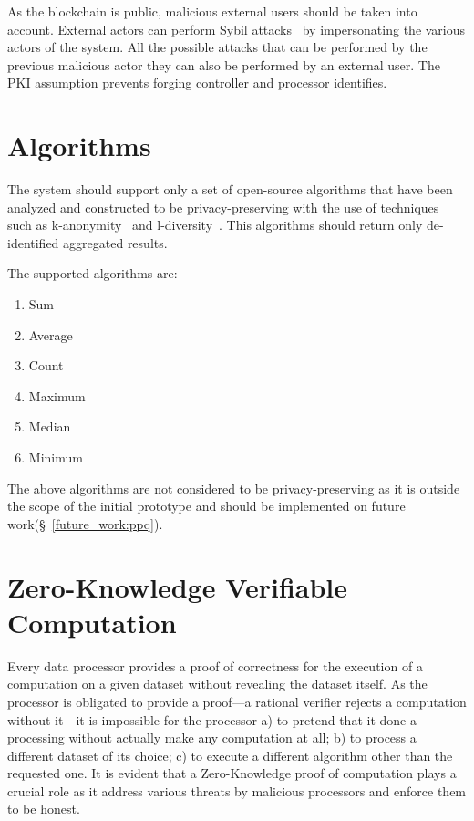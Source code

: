As the blockchain is public, malicious external users should be taken into account. External actors can perform Sybil attacks~\cite{sybil_attack} by impersonating the various actors of the system. All the possible attacks that can be performed by the previous malicious actor they can also be performed by an external user. The PKI assumption prevents forging controller and processor identifies.

\section{Algorithms}
\label{solution:algorithms}

The system should support only a set of open-source algorithms that have been analyzed and constructed to be privacy-preserving with the use of techniques such as k-anonymity~\cite{Samarati98protectingprivacy} and l-diversity~\cite{Aggarwal2008}. This algorithms should return only de-identified aggregated results.

The supported algorithms are:

\begin{enumerate}
  \item Sum
  \item Average
  \item Count
  \item Maximum
  \item Median
  \item Minimum
\end{enumerate}

The above algorithms are not considered to be privacy-preserving as it is outside the scope of the initial prototype and should be implemented on future work(§~\ref{future_work:ppq}).

\section{Zero-Knowledge Verifiable Computation}
\label{solution:proof}

Every data processor provides a proof of correctness for the execution of a computation on a given dataset without revealing the dataset itself. As the processor is obligated to provide a proof---a rational verifier rejects a computation without it---it is impossible for the processor a) to pretend that it done a processing without actually make any computation at all; b) to process a different dataset of its choice; c) to execute a different algorithm other than the requested one. It is evident that a Zero-Knowledge proof of computation plays a crucial role as it address various threats by malicious processors and enforce them to be honest.

